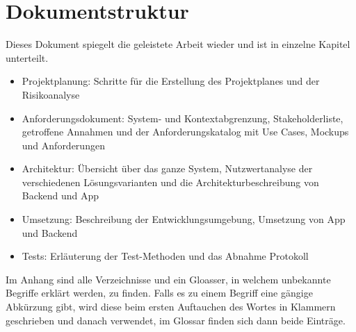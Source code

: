\section{Dokumentstruktur}\label{nicht_ziele}
Dieses Dokument spiegelt die geleistete Arbeit wieder und ist in einzelne Kapitel unterteilt.
\begin{itemize}
\item Projektplanung: Schritte für die Erstellung des Projektplanes und der Risikoanalyse
\item Anforderungsdokument: System- und Kontextabgrenzung, Stakeholderliste, getroffene Annahmen und der Anforderungskatalog mit Use Cases, Mockups und Anforderungen
\item Architektur: Übersicht über das ganze System, Nutzwertanalyse der verschiedenen Lösungsvarianten und die Architekturbeschreibung von Backend und App
\item Umsetzung: Beschreibung der Entwicklungsumgebung, Umsetzung von App und Backend
\item Tests: Erläuterung der Test-Methoden und das Abnahme Protokoll
\end{itemize}

Im Anhang sind alle Verzeichnisse und ein Gloasser, in welchem unbekannte Begriffe erklärt werden, zu finden. Falls es zu einem Begriff eine gängige Abkürzung gibt, wird diese beim ersten Auftauchen des Wortes in Klammern geschrieben und danach verwendet, im Glossar finden sich dann beide Einträge.
